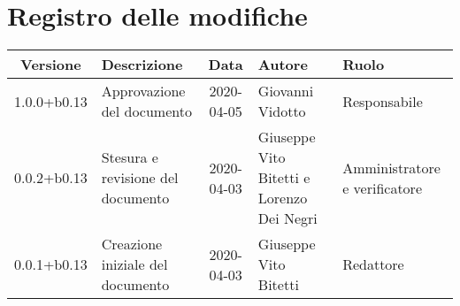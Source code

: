 \section*{Registro delle modifiche}

\begin{center}
	\begin{longtable}{|c|p{3.5cm}|c|p{3cm}|p{3cm}|}
	\hline
	\rowcolor{lighter-grayer}
	\textbf{Versione} & \textbf{Descrizione} & \textbf{Data} & \textbf{Autore} & \textbf{Ruolo} \\
	\hline
	\endfirsthead

	1.0.0+b0.13 & Approvazione del documento & 2020-04-05 & Giovanni Vidotto & Responsabile \\
	\hline
	0.0.2+b0.13 & Stesura e revisione del documento & 2020-04-03 & Giuseppe Vito Bitetti e Lorenzo Dei Negri & Amministratore e verificatore \\
	\hline
	0.0.1+b0.13 & Creazione iniziale del documento & 2020-04-03 & Giuseppe Vito Bitetti & Redattore \\
	\hline

	\end{longtable}
\end{center}
